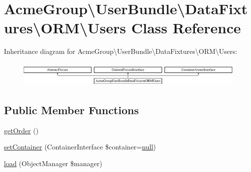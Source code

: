 \hypertarget{class_acme_group_1_1_user_bundle_1_1_data_fixtures_1_1_o_r_m_1_1_users}{\section{Acme\+Group\textbackslash{}User\+Bundle\textbackslash{}Data\+Fixtures\textbackslash{}O\+R\+M\textbackslash{}Users Class Reference}
\label{class_acme_group_1_1_user_bundle_1_1_data_fixtures_1_1_o_r_m_1_1_users}
}
Inheritance diagram for Acme\+Group\textbackslash{}User\+Bundle\textbackslash{}Data\+Fixtures\textbackslash{}O\+R\+M\textbackslash{}Users\+:\begin{figure}[H]
\begin{center}
\leavevmode
\includegraphics[height=1.244444cm]{class_acme_group_1_1_user_bundle_1_1_data_fixtures_1_1_o_r_m_1_1_users}
\end{center}
\end{figure}
\subsection*{Public Member Functions}
\begin{DoxyCompactItemize}
\item 
\hyperlink{class_acme_group_1_1_user_bundle_1_1_data_fixtures_1_1_o_r_m_1_1_users_a3a3b00513789b5ee91cd320a898612d9}{get\+Order} ()
\item 
\hyperlink{class_acme_group_1_1_user_bundle_1_1_data_fixtures_1_1_o_r_m_1_1_users_a8b63301d731bd7868d889c2804933ad9}{set\+Container} (Container\+Interface \$container=\hyperlink{validate_8js_afb8e110345c45e74478894341ab6b28e}{null})
\item 
\hyperlink{class_acme_group_1_1_user_bundle_1_1_data_fixtures_1_1_o_r_m_1_1_users_a058d41458459b82d22ebfbd1cd3b1e85}{load} (Object\+Manager \$manager)
\end{DoxyCompactItemize}


